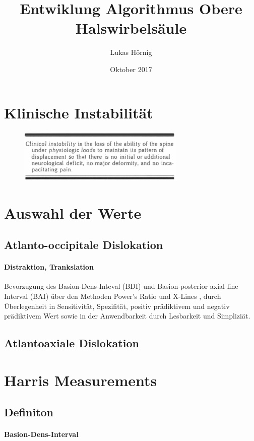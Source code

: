 \documentclass{report}
\title{Entwiklung Algorithmus Obere Halswirbelsäule}
\author{Lukas Hörnig}
\date{Oktober 2017}
\begin{document}
\section{Klinische Instabilität}
\begin{figure}[h]
        \includegraphics[width=8cm]{Instability.png}
\end{figure}

\section{Auswahl der Werte}
\subsection{Atlanto-occipitale Dislokation}
\paragraph{Distraktion, Trankslation}
Bevorzugung des Basion-Dens-Inteval (BDI) und Basion-posterior axial line Interval (BAI) \cite{WHOLEY1958,Harris1994,Harris1994a} über den Methoden Power's Ratio \cite{Powers1979} und X-Lines \cite{Lee1987}, durch Überlegenheit in Sensitivität, Spezifität, positiv prädiktivem und negativ prädiktivem Wert sowie in der Anwendbarkeit durch Lesbarkeit und Simpliziät. \cite{Deliganis2000,Fisher2001,Harris1994,Dziurzynski2005,Radcliff2010,Chang2009,Chaput2011,Bono2007}

\subsection{Atlantoaxiale Dislokation}

\section{Harris Measurements}
\subsection{Definiton}
\paragraph{Basion-Dens-Interval}
\end{document}
